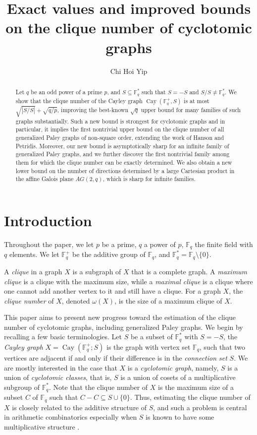 \documentclass[12pt,reqno]{amsart}
\title{Exact values and improved bounds on the clique number of cyclotomic graphs}
\author{Chi Hoi Yip}
\theoremstyle{definition}
\newcommand{\F}{\mathbb{F}}
\begin{document}
\begin{abstract}
Let $q$ be an odd power of a prime $p$, and $S \subseteq \F_q^*$ such that $S=-S$ and $S/S \neq \F_q^*$. We show that the clique number of the Cayley graph $\operatorname{Cay}(\F_q^+,S)$ is at most $\sqrt{|S/S|}+\sqrt{q/p}$, improving the best-known $\sqrt{q}$ upper bound for many families of such graphs substantially. Such a new bound is strongest for cyclotomic graphs and in particular, it implies the first nontrivial upper bound on the clique number of all generalized Paley graphs of non-square order, extending the work of Hanson and Petridis. Moreover, our new bound is asymptotically sharp for an infinite family of generalized Paley graphs, and we further discover the first nontrivial family among them for which the clique number can be exactly determined. We also obtain a new lower bound on the number of directions determined by a large Cartesian product in the affine Galois plane $AG(2,q)$, which is sharp for infinite families.
\end{abstract}

\maketitle

\section{Introduction}

Throughout the paper, we let $p$ be a prime, $q$ a power of $p$, $\F_q$ the finite field with $q$ elements. We let $\F_q^+$ be the additive group of $\F_q$, and $\F_q^*=\F_q \setminus \{0\}$. 

A {\em clique} in a graph $X$ is a subgraph of $X$ that is a complete graph.  A {\em maximum clique} is a clique with the maximum size, while a {\em maximal clique} is a clique where one cannot add another vertex to it and still have a clique. For a graph $X$, the {\em clique number} of $X$, denoted $\omega (X)$, is the size of a maximum clique of $X$. 

This paper aims to present new progress toward the estimation of the clique number of cyclotomic graphs, including generalized Paley graphs. We begin by recalling a few basic terminologies. Let $S$ be a subset of $\F_q^*$ with $S=-S$, the \emph{Cayley graph} $X=\operatorname{Cay}(\F_q^+;S)$ is the graph with vertex set $\F_q$, such that two vertices are adjacent if and only if their difference is in the \emph{connection set} $S$. We are mostly interested in the case that $X$ is a \emph{cyclotomic graph}, namely, $S$ is a union of \emph{cyclotomic classes}, that is, $S$ is a union of cosets of a multiplicative subgroup of $\F_q^*$. Note that the clique number of $X$ is the maximum size of a subset $C$ of $\F_q$ such that $C-C \subseteq S \cup \{0\}$. Thus, estimating the clique number of $X$ is closely related to the additive structure of $S$, and such a problem is central in arithmetic combinatorics especially when $S$ is known to have some multiplicative structure \cite{CL07}. 
\end{document}
